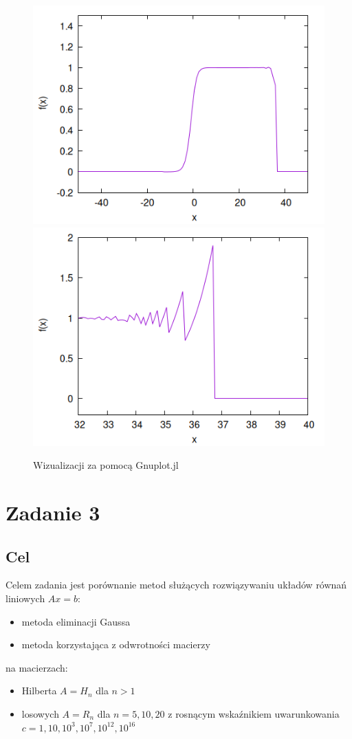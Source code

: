 \documentclass{article}
\begin{document}
\begin{figure}[h!]
    \centering
    \includegraphics[scale=0.49]{plots/f(x)-1-gnuplot.png}
    \includegraphics[scale=0.49]{plots/f(x)-2-gnuplot.png}
    \caption{Wizualizacji za pomocą Gnuplot.jl}
\end{figure}

\newpage

\section{Zadanie 3}
\subsection{Cel}
Celem zadania jest porównanie metod służących rozwiązywaniu układów równań liniowych $Ax = b$:
\begin{itemize}
    \item metoda eliminacji Gaussa
    \item metoda korzystająca z odwrotności macierzy
\end{itemize}
na macierzach:
\begin{itemize}
    \item Hilberta $A = H_n$ dla $n > 1$
    \item losowych $A = R_n$ dla $n=5, 10, 20$ z rosnącym wskaźnikiem uwarunkowania $c = 1, 10, 10^3, 10^7, 10^{12}, 10^{16}$
\end{itemize}
\end{document}
